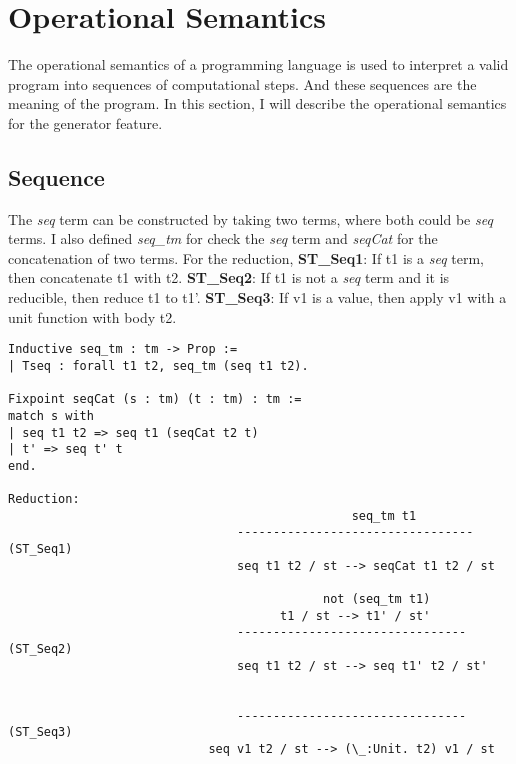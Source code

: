 \section{Operational Semantics}
\label{sec:os}
The operational semantics of a programming language is used to interpret a valid program into sequences of computational steps. And these sequences are the meaning of the program. In this section, I will describe the operational semantics for the generator feature.

\subsection{Sequence}
The \textit{seq} term can be constructed by taking two terms, where both could be \textit{seq} terms.
I also defined \textit{seq_tm} for check the \textit{seq} term and \textit{seqCat} for the concatenation of two terms.
For the reduction, \textbf{ST_Seq1}: If t1 is a \textit{seq} term, then concatenate t1 with t2. 
\textbf{ST_Seq2}: If t1 is not a \textit{seq} term and it is reducible, then reduce t1 to t1'. 
\textbf{ST_Seq3}: If v1 is a value, then apply v1 with a unit function with body t2.
\begin{lstlisting}
Inductive seq_tm : tm -> Prop :=
| Tseq : forall t1 t2, seq_tm (seq t1 t2).

Fixpoint seqCat (s : tm) (t : tm) : tm :=
match s with
| seq t1 t2 => seq t1 (seqCat t2 t)
| t' => seq t' t
end.

Reduction:
									    		seq_tm t1
								---------------------------------  (ST_Seq1)
								seq t1 t2 / st --> seqCat t1 t2 / st
								
											not (seq_tm t1)
									  t1 / st --> t1' / st'
								--------------------------------   (ST_Seq2)
								seq t1 t2 / st --> seq t1' t2 / st'
								

								--------------------------------   (ST_Seq3)
							seq v1 t2 / st --> (\_:Unit. t2) v1 / st
\end{lstlisting}

